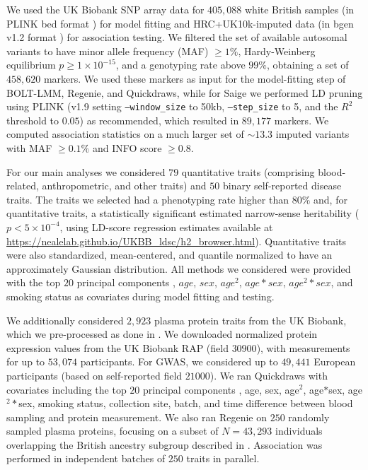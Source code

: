 We used the UK Biobank SNP array data for $405{,}088$ white British samples \cite{bycroft2018uk} (in PLINK bed format \cite{purcell2007plink,chang2015second}) for model fitting and HRC+UK10k-imputed data \cite{haplotype2016reference,uk10k2015uk10k,bycroft2018uk} (in bgen v1.2 format \cite{band2018bgen}) for association testing.
%
We filtered the set of available autosomal variants to have minor allele frequency (MAF) $\geq 1\%$, Hardy-Weinberg equilibrium $p \geq 1 \times 10^{-15}$, and a genotyping rate above $99\%$, obtaining a set of $458{,}620$ markers.
%
We used these markers as input for the model-fitting step of BOLT-LMM, Regenie, and Quickdraws, while for Saige we performed LD pruning using PLINK (v1.9 \cite{purcell2007plink,chang2015second} setting \texttt{--window\_size} to 50kb, \texttt{--step\_size} to 5, and the $R^2$ threshold to $0.05$) as recommended, which resulted in $89,177$ markers.
%
We computed association statistics on a much larger set of ${\sim}13.3$ imputed variants with MAF $\geq 0.1\%$ and INFO score $\geq 0.8$.
%

%
For our main analyses we considered $79$ quantitative traits (comprising blood-related, anthropometric, and other traits) and $50$ binary self-reported disease traits.
%
The traits we selected had a phenotyping rate higher than $80\%$ and, for quantitative traits, a statistically significant estimated narrow-sense heritability ($p < 5 \times 10^{-4}$, using LD-score regression estimates available at \url{https://nealelab.github.io/UKBB_ldsc/h2_browser.html}).
%
Quantitative traits were also standardized, mean-centered, and quantile normalized to have an approximately Gaussian distribution.
%
All methods we considered were provided with the top $20$ principal components \cite{bycroft2018uk}, $age$, $sex$, $age^2$, $age*sex$, $age^2*sex$, and smoking status as covariates during model fitting and testing.
%

We additionally considered $2{,}923$ plasma protein traits from the UK Biobank, which we pre-processed as done in \cite{sun2023plasma, dhindsa2023rare}.
%
We downloaded normalized protein expression values from the UK Biobank RAP (field $30900$), with measurements for up to $53{,}074$ participants.
%
For GWAS, we considered up to $49{,}441$ European participants (based on self-reported field $21000$).
%
We ran Quickdraws with covariates including the top $20$ principal components \cite{bycroft2018uk}, age, sex, age$^2$, age$*$sex, age$^2*$sex, smoking status, collection site, batch, and time difference between blood sampling and protein measurement.
%
We also ran Regenie on $250$ randomly sampled plasma proteins, focusing on a subset of $N=43{,}293$ individuals overlapping the British ancestry subgroup described in \cite{bycroft2018uk}.
%
Association was performed in independent batches of $250$ traits in parallel.

